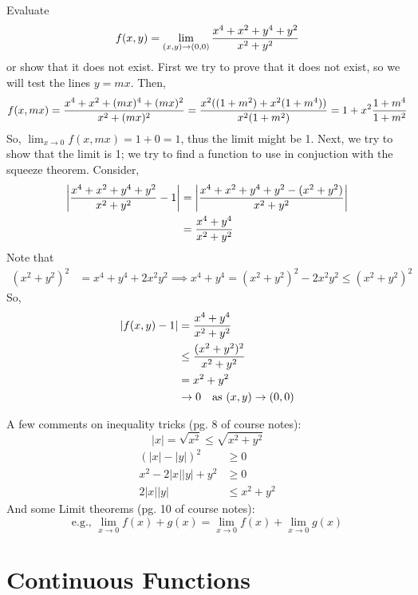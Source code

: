 \documentclass[english, 11pt]{article}
\begin{document}
  \begin{exmp}
    Evaluate
    \[ f(x,y) = \lim_{(x,y)\rightarrow(0,0)} \frac{x^4 + x^2 + y^4 + y^2}{x^2 + y^2} \]
    or show that it does not exist. First we try to prove that it does not exist, so we will test the lines $y = mx$. Then,
    \[ f(x,mx) = \frac{x^4+x^2+(mx)^4+(mx)^2}{x^2 + (mx)^2} = \frac{x^2((1+m^2)+x^2(1+m^4))}{x^2(1+m^2)} = 1 + x^2 \frac{1+m^4}{1+m^2}\]
    So, $\lim_{x\rightarrow 0} f(x,mx) = 1 + 0 = 1$, thus the limit might be 1. Next, we try to show that the limit is 1; we try to find a function to use in conjuction with the squeeze theorem. Consider,
    \begin{align*}
      \left| \frac{x^4+x^2+y^4+y^2}{x^2+y^2} - 1 \right| & = \left| \frac{x^4+x^2+y^4+y^2-(x^2+y^2)}{x^2+y^2} \right| \\
             & = \frac{x^4+y^4}{x^2+y^2}
    \end{align*}
    Note that
      \begin{align*}
        (x^2 + y^2)^2 & = x^4 + y^4 + 2x^2y^2 \implies x^4 + y^4 = (x^2 + y^2)^2 - 2x^2y^2 \leq (x^2 + y^2)^2
      \end{align*}
      So,
      \begin{align*}
        |f(x,y)-1| & = \frac{x^4+y^4}{x^2+y^2} \\
        & \leq \frac{(x^2+y^2)^2}{x^2+y^2} \\
        & = x^2 + y^2 \\
        & \rightarrow 0 \mbox { \ \ as $(x,y) \rightarrow (0,0)$}
      \end{align*}
  \end{exmp}

  \begin{rem} A few comments on inequality tricks (pg. 8 of course notes):
    \[ |x| = \sqrt{x^2} \leq \sqrt{x^2 + y^2} \]
    \begin{align*}
       (|x|-|y|)^2 & \geq 0 \\
       x^2 - 2|x||y| + y^2 & \geq 0 \\
       2|x||y| & \leq x^2 + y^2
     \end{align*}
     And some Limit theorems (pg. 10 of course notes):
     \[ \mbox{e.g., } \lim_{x\rightarrow0} f(x) + g(x) = \lim_{x\rightarrow0} f(x)+ \lim_{x\rightarrow0} g(x) \]
  \end{rem}

  \section{Continuous Functions}
\end{document}
